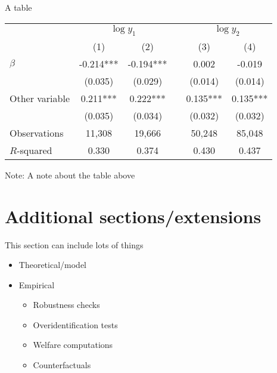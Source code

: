 \documentclass[aspectratio=169, 11pt]{beamer}
\begin{document}
\begin{frame}{A table}
    \footnotesize
    \setlength{\tabcolsep}{0.5em}
    \begin{center}
    \begin{tabular}{lSScSS}
    &  && 
       \\
            & {(1)}     & {(2)}     && {(3)}     & {(4)}     \\ \midrule
    $\beta$
            & -0.214*** & -0.194*** &&  0.002    & -0.019    \\
            & (0.035)   & (0.029)   && (0.014)   & (0.014)   \\
    Other variable
            &  0.211*** &  0.222*** &&  0.135*** &  0.135*** \\
            & (0.035)   & (0.034)   && (0.032)   & (0.032)   \\ \midrule
    Observations 
            &  {11,308} & {19,666}  && {50,248}  & {85,048}  \\
    $R$-squared
            & {0.330}   & {0.374}   && {0.430}   & {0.437}   \\
    \end{tabular}%
    \end{center}
    
    Note: A note about the table above
\end{frame}

\section{Additional sections/extensions}

\begin{frame}
    This section can include lots of things
    
    \begin{itemize}
        \item Theoretical/model
        \item Empirical
        \begin{itemize}
            \item Robustness checks
            \item Overidentification tests
            \item Welfare computations
            \item Counterfactuals
        \end{itemize}
    \end{itemize}
\end{frame}
\end{document}
